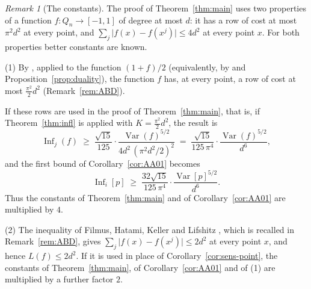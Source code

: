 \documentclass[11pt,reqno]{amsart}
\theoremstyle{definition}
\theoremstyle{remark}
\newtheorem{remark}[theorem]{Remark}
\numberwithin{equation}{section}
\theoremstyle{named}
\theoremstyle{plain}
\newcommand{\Var}{\operatorname{Var}}
\newcommand{\Inf}{\operatorname{Inf}}
\newcommand{\abs}[1]{\lvert #1\rvert}
\begin{document}
\begin{remark}[The constants]\label{rem:constant}
The proof of Theorem~\ref{thm:main} uses two properties of a function $f\colon Q_n\to[-1,1]$ of
degree at most $d$: it has a row of cost at most $\pi^{2}d^{2}$ at every point, and
$\sum_j\abs{f(x)-f(x^{j})}\le4d^{2}$ at every point $x$. For both properties better constants are
known.

(1) By \cite[Theorem~1.7]{ABD}, applied to the function $(1+f)/2$ (equivalently, by
\cite[Theorem~3.3]{ABD} and Proposition~\ref{prop:duality}), the function $f$ has, at every point, a
row of cost at most $\frac{\pi^{2}}{2}d^{2}$ (Remark~\ref{rem:ABD}).

If these rows are used in the
proof of Theorem~\ref{thm:main}, that is, if Theorem~\ref{thm:infl} is applied with
$K=\frac{\pi^{2}}{2}d^{2}$, the result is
\[
   \Inf_j(f)\;\ge\;\frac{\sqrt{15}}{125}\cdot\frac{\Var(f)^{5/2}}{4d^{2}\,(\pi^{2}d^{2}/2)^{2}}
   \;=\;\frac{\sqrt{15}}{125\,\pi^{4}}\cdot\frac{\Var(f)^{5/2}}{d^{6}},
\]
and the first bound of Corollary~\ref{cor:AA01} becomes
\[
   \Inf_i[p]\;\ge\;\frac{32\sqrt{15}}{125\,\pi^{4}}\cdot\frac{\Var[p]^{5/2}}{d^{6}}.
\]
Thus the constants of Theorem~\ref{thm:main} and of Corollary~\ref{cor:AA01} are multiplied
by $4$.

(2) The inequality of Filmus, Hatami, Keller and Lifshitz \cite[Theorem~3.3]{FHKL}, which is
recalled in Remark~\ref{rem:ABD}, gives $\sum_j\abs{f(x)-f(x^{j})}\le2d^{2}$ at every point $x$,
and hence $L(f)\le2d^{2}$. If it is used in place of Corollary~\ref{cor:sens-point}, the constants
of Theorem~\ref{thm:main}, of Corollary~\ref{cor:AA01} and of (1) are multiplied by a further
factor $2$.
\end{remark}
\end{document}
